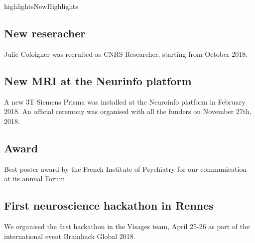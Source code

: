 \documentclass{ra2018}
\begin{document}

\begin{module}{highlights}{NewHighlights}{}

\subsection{New reseracher}
Julie Coloigner was recruited as CNRS Researcher, starting from October 2018.

\subsection{New MRI at the Neurinfo platform}
A new 3T Siemens Prisma was installed at the Neuroinfo platform in February 2018. An official ceremony was organised with all the funders on November 27th, 2018.

\subsection{Award}
Best poster award by the French Institute of Psychiatry for our communication at its annual Forum~.

\subsection{First neuroscience hackathon in Rennes}
We organised the first hackathon in the Visages team, April 25-26 as part of the international event Brainhack Global 2018.



\end{module}
\end{document}
